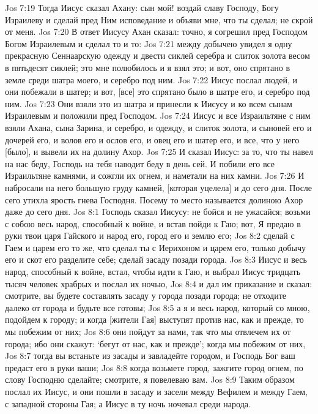 Jos 7:19  Тогда Иисус сказал Ахану: сын мой! воздай славу Господу, Богу Израилеву и сделай пред Ним исповедание и объяви мне, что ты сделал; не скрой от меня.
Jos 7:20  В ответ Иисусу Ахан сказал: точно, я согрешил пред Господом Богом Израилевым и сделал то и то:
Jos 7:21  между добычею увидел я одну прекрасную Сеннаарскую одежду и двести сиклей серебра и слиток золота весом в пятьдесят сиклей; это мне полюбилось и я взял это; и вот, оно спрятано в земле среди шатра моего, и серебро под ним.
Jos 7:22  Иисус послал людей, и они побежали в шатер; и вот, [все] это спрятано было в шатре его, и серебро под ним.
Jos 7:23  Они взяли это из шатра и принесли к Иисусу и ко всем сынам Израилевым и положили пред Господом.
Jos 7:24  Иисус и все Израильтяне с ним взяли Ахана, сына Зарина, и серебро, и одежду, и слиток золота, и сыновей его и дочерей его, и волов его и ослов его, и овец его и шатер его, и все, что у него [было], и вывели их на долину Ахор.
Jos 7:25  И сказал Иисус: за то, что ты навел на нас беду, Господь на тебя наводит беду в день сей. И побили его все Израильтяне камнями, и сожгли их огнем, и наметали на них камни.
Jos 7:26  И набросали на него большую груду камней, [которая уцелела] и до сего дня. После сего утихла ярость гнева Господня. Посему то место называется долиною Ахор даже до сего дня.
Jos 8:1  Господь сказал Иисусу: не бойся и не ужасайся; возьми с собою весь народ, способный к войне, и встав пойди к Гаю; вот, Я предаю в руки твои царя Гайского и народ его, город его и землю его;
Jos 8:2  сделай с Гаем и царем его то же, что сделал ты с Иерихоном и царем его, только добычу его и скот его разделите себе; сделай засаду позади города.
Jos 8:3  Иисус и весь народ, способный к войне, встал, чтобы идти к Гаю, и выбрал Иисус тридцать тысяч человек храбрых и послал их ночью,
Jos 8:4  и дал им приказание и сказал: смотрите, вы будете составлять засаду у города позади города; не отходите далеко от города и будьте все готовы;
Jos 8:5  а я и весь народ, который со мною, подойдем к городу; и когда [жители Гая] выступят против нас, как и прежде, то мы побежим от них;
Jos 8:6  они пойдут за нами, так что мы отвлечем их от города; ибо они скажут: `бегут от нас, как и прежде'; когда мы побежим от них,
Jos 8:7  тогда вы встаньте из засады и завладейте городом, и Господь Бог ваш предаст его в руки ваши;
Jos 8:8  когда возьмете город, зажгите город огнем, по слову Господню сделайте; смотрите, я повелеваю вам.
Jos 8:9  Таким образом послал их Иисус, и они пошли в засаду и засели между Вефилем и между Гаем, с западной стороны Гая; а Иисус в ту ночь ночевал среди народа.
